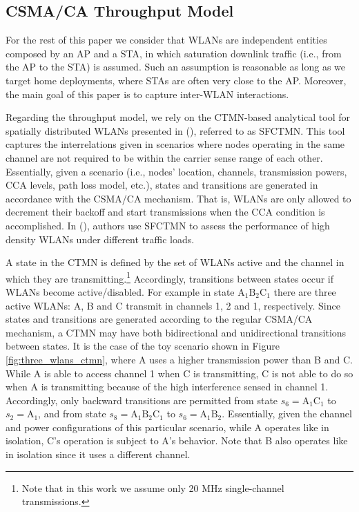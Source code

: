 \documentclass[preprint,12pt]{elsarticle}
\begin{document}
\subsection{CSMA/CA Throughput Model}
\label{section:throughput_model}		
For the rest of this paper we consider that WLANs are independent entities composed by an AP and a STA, in which saturation downlink traffic (i.e., from the AP to the STA) is assumed. Such an assumption is  reasonable as long as we target home deployments, where STAs are often very close to the AP. Moreover, the main goal of this paper is to capture inter-WLAN interactions.

Regarding the throughput model, we rely on the CTMN-based analytical tool for spatially distributed WLANs presented in (\citealp{barrachina2018performance}), referred to as SFCTMN. This tool captures the interrelations given in scenarios where nodes operating in the same channel are not required to be within the carrier sense range of each other. Essentially, given a scenario (i.e., nodes' location, channels, transmission powers, CCA levels, path loss model, etc.), states and transitions are generated in accordance with the CSMA/CA mechanism. That is, WLANs are only allowed to decrement their backoff and start transmissions when the CCA condition is accomplished. In (\citealp{barrachina2018overlap}), authors use SFCTMN to assess the performance of high density WLANs under different traffic loads.

A state in the CTMN is defined by the set of WLANs active and the channel in which they are transmitting.\footnote{Note that in this work we assume only 20 MHz single-channel transmissions.} Accordingly, transitions between states occur if WLANs become active/disabled. For example in state $\text{A}_1 \text{B}_2 \text{C}_1$ there are three active WLANs: A, B and C transmit in channels 1, 2 and 1, respectively. Since states and transitions are generated according to the regular CSMA/CA mechanism, a CTMN may have both bidirectional and unidirectional transitions between states. It is the case of the toy scenario shown in Figure \ref{fig:three_wlans_ctmn}, where A uses a higher transmission power than B and C. While A is able to access channel 1 when C is transmitting, C is not able to do so when A is transmitting because of the high interference sensed in channel 1. Accordingly, only backward transitions are permitted from state $s_6 = \text{A}_1 \text{C}_1$ to $s_2 = \text{A}_1$, and from state $s_8 = \text{A}_1 \text{B}_2 \text{C}_1$ to $s_6 = \text{A}_1 \text{B}_2$. Essentially, given the channel and power configurations of this particular scenario, while A operates like in isolation, C's operation is subject to A's behavior. Note that B also operates like in isolation since it uses a different channel.
\end{document}
